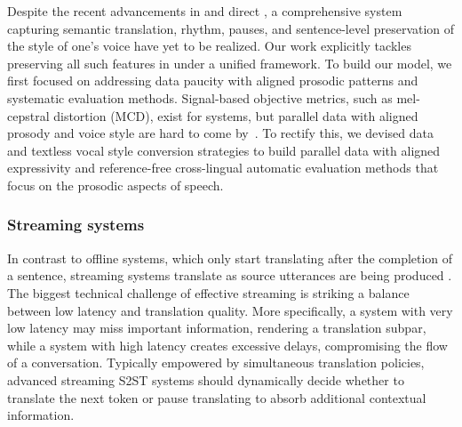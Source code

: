 Despite the recent advancements in \tts and direct \sst \citep{valle-x,audiopalm}, a comprehensive \sst system capturing semantic translation, rhythm, pauses,
and sentence-level preservation of the style of one's voice have yet to be realized. Our work explicitly tackles preserving all such features in \sst under a unified framework.
To build our model, we first focused on addressing \sst data paucity with aligned prosodic patterns and systematic evaluation methods. 
Signal-based objective metrics, such as mel-cepstral distortion (MCD), exist for \tts systems, but parallel \sst data with aligned prosody and voice style are hard to come by~\citep{neubig2014collection,cvss,ward2023dral}. To rectify this, we devised data and textless vocal style conversion strategies to build parallel \sst data with aligned expressivity and reference-free cross-lingual automatic evaluation methods that focus on the prosodic aspects of speech.

\subsubsection{Streaming systems}
\label{sec:related_work.streaming}
In contrast to offline systems, which only start translating after the completion of a sentence, streaming systems translate as source utterances are being produced \citep{cho2016can}. The biggest technical challenge of effective streaming is striking a balance between low latency and translation quality. More specifically, a system with very low latency may miss important information, rendering a translation subpar, while a system with high latency creates excessive delays, compromising the flow of a conversation. Typically empowered by simultaneous translation policies, advanced streaming S2ST systems should dynamically decide whether to translate the next token or pause translating to absorb additional contextual information.
 
